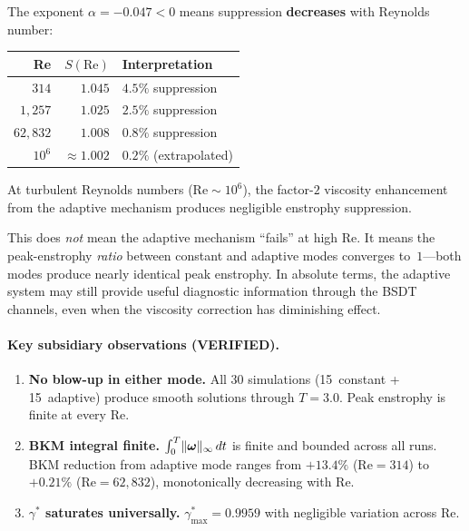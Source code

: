 \begin{corollary}
\label{cor:suppression_vanishes}
The exponent $\alpha = -0.047 < 0$ means suppression
\textbf{decreases} with Reynolds number:
\begin{center}
\begin{tabular}{@{}rrl@{}}
\toprule
Re & $S(\mathrm{Re})$ & Interpretation \\
\midrule
$314$ & $1.045$ & $4.5\%$ suppression \\
$1{,}257$ & $1.025$ & $2.5\%$ suppression \\
$62{,}832$ & $1.008$ & $0.8\%$ suppression \\
$10^6$ & $\approx 1.002$ & $0.2\%$ (extrapolated) \\
\bottomrule
\end{tabular}
\end{center}
At turbulent Reynolds numbers ($\mathrm{Re} \sim 10^6$),
the factor-$2$ viscosity enhancement from the adaptive mechanism
produces negligible enstrophy suppression.
\end{corollary}

\begin{remark}
This does \emph{not} mean the adaptive mechanism ``fails'' at
high Re.  It means the peak-enstrophy \emph{ratio} between
constant and adaptive modes converges to~$1$---both modes
produce nearly identical peak enstrophy.  In absolute terms,
the adaptive system may still provide useful diagnostic
information through the BSDT channels, even when the
viscosity correction has diminishing effect.
\end{remark}

\paragraph{Key subsidiary observations (VERIFIED).}
\begin{enumerate}
\item \textbf{No blow-up in either mode.}  All 30 simulations
  (15~constant + 15~adaptive) produce smooth solutions through
  $T=3.0$.  Peak enstrophy is finite at every Re.

\item \textbf{BKM integral finite.}  $\int_0^T
  \lVert \bm{\omega} \rVert_\infty\,dt$ is finite and bounded across
  all runs.  BKM reduction from adaptive mode ranges from
  $+13.4\%$ (Re$=314$) to $+0.21\%$ (Re$=62{,}832$),
  monotonically decreasing with Re.

\item \textbf{$\gamma^*$ saturates universally.}
  $\gamma^*_{\max} = 0.9959$ with negligible variation
  across Re.
\end{enumerate}

